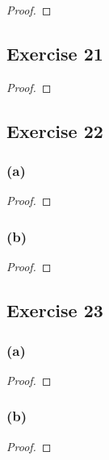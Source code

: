 \documentclass[14pt]{extarticle}
\begin{document}
\begin{proof}

\end{proof}

\subsection{Exercise 21}

\begin{proof}

\end{proof}

\subsection{Exercise 22}

\subsubsection{(a)}

\begin{proof}

\end{proof}

\subsubsection{(b)}

\begin{proof}

\end{proof}

\subsection{Exercise 23}

\subsubsection{(a)}

\begin{proof}

\end{proof}

\subsubsection{(b)}

\begin{proof}

\end{proof}
\end{document}
